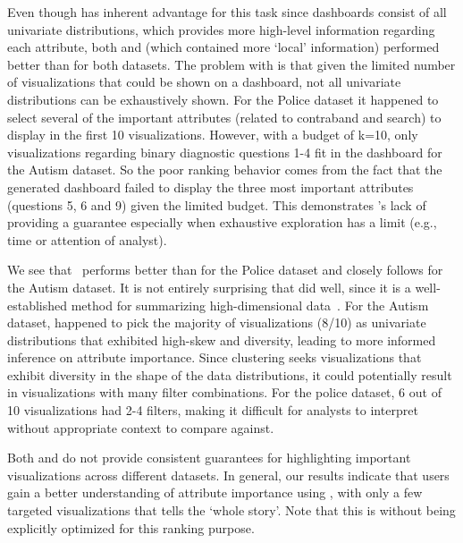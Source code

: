\par Even though \BFS has inherent advantage for this task since \BFS dashboards consist of all univariate distributions, which provides more high-level information regarding each attribute, both \system and \cluster (which contained more `local' information) performed better than \BFS for both datasets. The problem with \BFS is that given the limited number of visualizations that could be shown on a dashboard, not all univariate distributions can be exhaustively shown. For the Police dataset it happened to select several of the important attributes (related to contraband and search) to display in the first 10 visualizations. However, with a budget of k=10, only visualizations regarding binary diagnostic questions 1-4 fit in the dashboard for the Autism dataset. So the poor ranking behavior comes from the fact that the \BFS generated dashboard failed to display the three most important attributes (questions 5, 6 and 9) given the limited budget. This demonstrates \BFS's lack of providing a guarantee especially when exhaustive exploration has a limit (e.g., time or attention of analyst). 
\par We see that \system\ performs better than \cluster for the Police dataset and closely follows \cluster for the Autism dataset. It is not entirely surprising that \cluster did well, since it is a well-established method for summarizing high-dimensional data~\cite{Han2005}. For the Autism dataset, \cluster happened to pick the majority of visualizations (8/10) as univariate distributions that exhibited high-skew and diversity, leading to more informed inference on attribute importance. Since clustering seeks visualizations that exhibit diversity in the shape of the data distributions, it could potentially result in visualizations with many filter combinations. For the police dataset, 6 out of 10 visualizations had 2-4 filters, making it difficult for analysts to interpret without appropriate context to compare against. 
\par Both \BFS and \cluster do not provide consistent guarantees for highlighting important visualizations across different datasets. In general, our results indicate that users gain a better understanding of attribute importance using \system, with only a few targeted visualizations that tells the `whole story'. Note that this is without \system being explicitly optimized for this ranking purpose.
